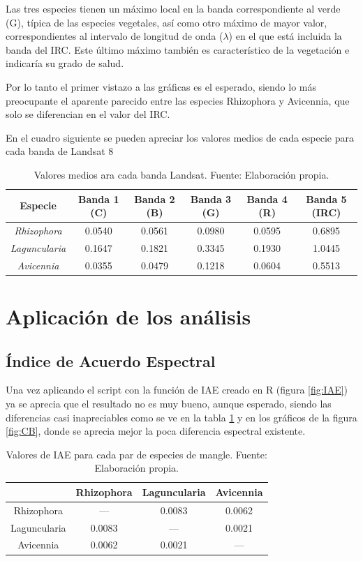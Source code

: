 Las tres especies tienen un máximo local en la banda correspondiente al verde (G), típica de las especies vegetales, así como otro máximo de mayor valor, correspondientes al intervalo de longitud de onda ($\lambda$) en el que está incluida la banda del \ac{IRC}. Este último máximo también es característico de la vegetación e indicaría su grado de salud.\Sep

Por lo tanto el primer vistazo a las gráficas es el esperado, siendo lo más preocupante el aparente parecido entre las especies Rhizophora y Avicennia, que solo se diferencian en el valor del \ac{IRC}.\Sep

En el cuadro siguiente se pueden apreciar los valores medios de cada especie para cada banda de Landsat 8

\begin{table}[ht]
	\centering
	\caption[Valores medios en las bandas Landsat]{Valores medios ara cada banda Landsat. Fuente: Elaboración propia.}
	\begin{tabular}{|c|c|c|c|c|c|}
	\hline
	Especie & Banda 1 (C) & Banda 2 (B) & Banda 3 (G) & Banda 4 (R) & Banda 5 (IRC) \\
	\hline
	\textit{Rhizophora}	& 0.0540 & 0.0561 & 0.0980 & 0.0595 & 0.6895 \\
	\hline	
	\textit{Laguncularia} & 0.1647 & 0.1821 & 0.3345 & 0.1930 & 1.0445 \\
	\hline
	\textit{Avicennia} & 0.0355 & 0.0479 & 0.1218 & 0.0604 & 0.5513 \\
	\hline
	\end{tabular}
\end{table}

\section{Aplicación de los análisis}
\subsection{Índice de Acuerdo Espectral}
Una vez aplicando el script con la función de \ac{IAE} creado en R (figura \ref{fig:IAE}) ya se aprecia que el resultado no es muy bueno, aunque esperado, siendo las diferencias casi inapreciables como se ve en la tabla \ref{tab:Valores_IAE} y en los gráficos de la figura \ref{fig:CB}, donde se aprecia mejor la poca diferencia espectral existente.\Sep

\begin{table}[ht]
	\centering
	\caption[Valores de IAE]{Valores de \ac{IAE} para cada par de especies de mangle. Fuente: Elaboración propia.}
	\begin{tabular}{|c|c|c|c|}
	\hline
	& Rhizophora & Laguncularia & Avicennia \\
	\hline
	Rhizophora & --- & 0.0083 & 0.0062 \\
	\hline
	Laguncularia & 0.0083 & --- & 0.0021 \\
	\hline
	Avicennia & 0.0062 & 0.0021 & --- \\
	\hline
	\end{tabular}
	\label{tab:Valores_IAE}
\end{table}


